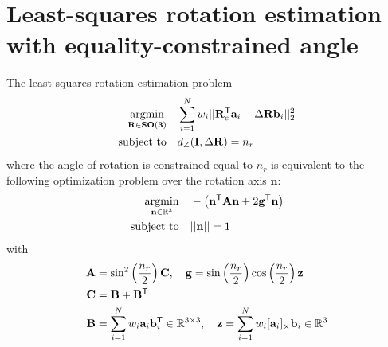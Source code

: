 \section{Least-squares rotation estimation with equality-constrained angle}
\label{proof:wls-relax-eq-constrained-rotation}

\begin{theorem}
	\label{thm:constrained-wahba-davenport}
	The least-squares rotation estimation problem 
	\begin{equation}
		\label{eq:tls-rwls-a}
		\begin{aligned}
			\operatorname*{argmin}_{\mathbf{R} \in \mathbf{SO(3)}}  \quad &\sum_{i=1}^{N} w_i ||\mathbf{R}_c^{\mathsf{T}} \mathbf{a}_i - \Delta\mathbf{R} \mathbf{b}_i ||_2^2 \\
			\text{subject to} \quad &d_{\angle}(\mathbf{I}, \Delta\mathbf{R}) = n_r
		\end{aligned}
	\end{equation}
	where the angle of rotation is constrained equal to $n_r$ is equivalent to the following optimization problem over the rotation axis $\mathbf{n}$:
	\begin{equation}
		\label{eq:rot-est-constrained-qcqp}
		\begin{aligned}
			\operatorname*{argmin}_{\mathbf{n} \in \mathbb{R}^3} \quad &-\left(\mathbf{n}^{\mathsf{T}} \mathbf{A} \mathbf{n} + 2 \mathbf{g}^{\mathsf{T}} \mathbf{n} \right)\\
			\text{subject to} \quad &|| \mathbf{n}|| = 1\\
		\end{aligned}
	\end{equation}
	with
	\begin{equation}
		\label{eq:ev-constr-data-mat-a}
		\begin{aligned}
			\mathbf{A} &= \sin^2 \left(\frac{n_r}{2} \right) \mathbf{C}, \quad \mathbf{g} =  \sin \left(\frac{n_r}{2} \right) \cos \left(\frac{n_r}{2} \right) \mathbf{z}\\
			\mathbf{C} &= \mathbf{B} + \mathbf{B}^{\mathsf{T}}\\
			\mathbf{B} &= \sum_{i=1}^N w_i \mathbf{a}_i\mathbf{b}_i^{\mathsf{T}} \in \mathbb{R}^{3 \times 3}, \quad
			\mathbf{z} = \sum_{i=1}^N w_i [\mathbf{a}_i]_{\times}\mathbf{b}_i \in \mathbb{R}^{3}
		\end{aligned}
	\end{equation}
\end{theorem}


